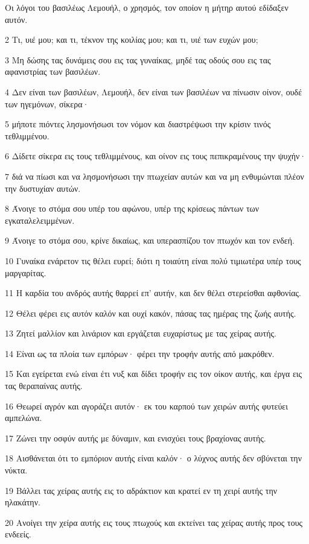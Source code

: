 \par Οι λόγοι του βασιλέως Λεμουήλ, ο χρησμός, τον οποίον η μήτηρ αυτού εδίδαξεν αυτόν.
\par 2 Τι, υιέ μου; και τι, τέκνον της κοιλίας μου; και τι, υιέ των ευχών μου;
\par 3 Μη δώσης τας δυνάμεις σου εις τας γυναίκας, μηδέ τας οδούς σου εις τας αφανιστρίας των βασιλέων.
\par 4 Δεν είναι των βασιλέων, Λεμουήλ, δεν είναι των βασιλέων να πίνωσιν οίνον, ουδέ των ηγεμόνων, σίκερα·
\par 5 μήποτε πιόντες λησμονήσωσι τον νόμον και διαστρέψωσι την κρίσιν τινός τεθλιμμένου.
\par 6 Δίδετε σίκερα εις τους τεθλιμμένους, και οίνον εις τους πεπικραμένους την ψυχήν·
\par 7 διά να πίωσι και να λησμονήσωσι την πτωχείαν αυτών και να μη ενθυμώνται πλέον την δυστυχίαν αυτών.
\par 8 Άνοιγε το στόμα σου υπέρ του αφώνου, υπέρ της κρίσεως πάντων των εγκαταλελειμμένων.
\par 9 Άνοιγε το στόμα σου, κρίνε δικαίως, και υπερασπίζου τον πτωχόν και τον ενδεή.
\par 10 Γυναίκα ενάρετον τις θέλει ευρεί; διότι η τοιαύτη είναι πολύ τιμιωτέρα υπέρ τους μαργαρίτας.
\par 11 Η καρδία του ανδρός αυτής θαρρεί επ' αυτήν, και δεν θέλει στερείσθαι αφθονίας.
\par 12 Θέλει φέρει εις αυτόν καλόν και ουχί κακόν, πάσας τας ημέρας της ζωής αυτής.
\par 13 Ζητεί μαλλίον και λινάριον και εργάζεται ευχαρίστως με τας χείρας αυτής.
\par 14 Είναι ως τα πλοία των εμπόρων· φέρει την τροφήν αυτής από μακρόθεν.
\par 15 Και εγείρεται ενώ είναι έτι νυξ και δίδει τροφήν εις τον οίκον αυτής, και έργα εις τας θεραπαίνας αυτής.
\par 16 Θεωρεί αγρόν και αγοράζει αυτόν· εκ του καρπού των χειρών αυτής φυτεύει αμπελώνα.
\par 17 Ζώνει την οσφύν αυτής με δύναμιν, και ενισχύει τους βραχίονας αυτής.
\par 18 Αισθάνεται ότι το εμπόριον αυτής είναι καλόν· ο λύχνος αυτής δεν σβύνεται την νύκτα.
\par 19 Βάλλει τας χείρας αυτής εις το αδράκτιον και κρατεί εν τη χειρί αυτής την ηλακάτην.
\par 20 Ανοίγει την χείρα αυτής εις τους πτωχούς και εκτείνει τας χείρας αυτής προς τους ενδεείς.
